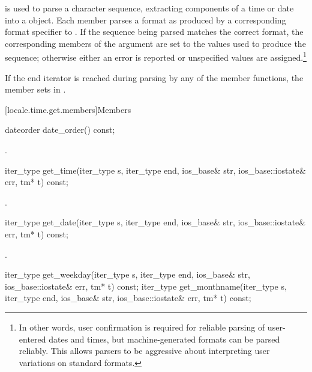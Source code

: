 \pnum
{}
is used to
parse a character sequence, extracting components of a time or date
into a
object.
Each
member parses a format as produced by a corresponding format specifier to
.
If the sequence being parsed matches the correct format, the corresponding
members of the
argument are set to the values used to produce the sequence; otherwise
either an error is reported or unspecified values are assigned.\footnote{In
other words, user confirmation is required for reliable parsing of
user-entered dates and times, but machine-generated formats can be
parsed reliably.
This allows parsers to be aggressive about
interpreting user variations on standard formats.}

\pnum
If the end iterator is reached during parsing by any of the
member functions, the member sets
in .

[locale.time.get.members]{Members}

%
\begin{itemdecl}
dateorder date_order() const;
\end{itemdecl}

\begin{itemdescr}
\pnum
\returns
{}.
\end{itemdescr}

%
\begin{itemdecl}
iter_type get_time(iter_type s, iter_type end, ios_base& str,
                   ios_base::iostate& err, tm* t) const;
\end{itemdecl}

\begin{itemdescr}
\pnum
\returns
{}.
\end{itemdescr}

%
\begin{itemdecl}
iter_type get_date(iter_type s, iter_type end, ios_base& str,
                   ios_base::iostate& err, tm* t) const;
\end{itemdecl}

\begin{itemdescr}
\pnum
\returns
{}.
\end{itemdescr}

%
%
\begin{itemdecl}
iter_type get_weekday(iter_type s, iter_type end, ios_base& str,
                      ios_base::iostate& err, tm* t) const;
iter_type get_monthname(iter_type s, iter_type end, ios_base& str,
                        ios_base::iostate& err, tm* t) const;
\end{itemdecl}

